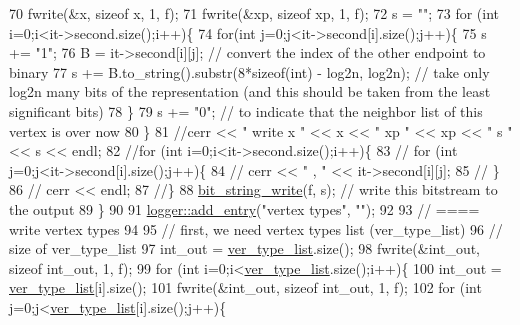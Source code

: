 \begin{DoxyCode}
70     fwrite(&x, \textcolor{keyword}{sizeof} x, 1, f);
71     fwrite(&xp, \textcolor{keyword}{sizeof} xp, 1, f);
72     s = \textcolor{stringliteral}{""};
73     \textcolor{keywordflow}{for} (\textcolor{keywordtype}{int} i=0;i<it->second.size();i++)\{
74       \textcolor{keywordflow}{for}(\textcolor{keywordtype}{int} j=0;j<it->second[i].size();j++)\{
75         s += \textcolor{stringliteral}{"1"};
76         B = it->second[i][j]; \textcolor{comment}{// convert the index of the other endpoint to binary}
77         s += B.to\_string().substr(8*\textcolor{keyword}{sizeof}(\textcolor{keywordtype}{int}) - log2n, log2n); \textcolor{comment}{// take only log2n many bits of the
       representation (and this should be taken from the least significant bits)}
78       \}
79       s += \textcolor{stringliteral}{"0"}; \textcolor{comment}{// to indicate that the neighbor list of this vertex is over now}
80     \}
81     \textcolor{comment}{//cerr << " write  x " << x << " xp " << xp << " s " << s << endl;}
82     \textcolor{comment}{//for (int i=0;i<it->second.size();i++)\{}
83     \textcolor{comment}{//  for (int j=0;j<it->second[i].size();j++)\{}
84     \textcolor{comment}{//    cerr << " , " << it->second[i][j];}
85     \textcolor{comment}{//  \}}
86     \textcolor{comment}{//  cerr << endl;}
87     \textcolor{comment}{//\}}
88     \hyperlink{compression__helper_8cpp_accfebfd921b967c2f09e8c11569eb832}{bit\_string\_write}(f, s); \textcolor{comment}{// write this bitstream to the output}
89   \}
90 
91   \hyperlink{classlogger_a710163deb17bc81f70d53d285b8ac9ac}{logger::add\_entry}(\textcolor{stringliteral}{"vertex types"}, \textcolor{stringliteral}{""});
92 
93   \textcolor{comment}{// ==== write vertex types}
94 
95   \textcolor{comment}{// first, we need vertex types list (ver\_type\_list)}
96   \textcolor{comment}{// size of ver\_type\_list}
97   int\_out = \hyperlink{classmarked__graph__compressed_af2e3e55223d436628a02758dfae88493}{ver\_type\_list}.size();
98   fwrite(&int\_out, \textcolor{keyword}{sizeof} int\_out, 1, f);
99   \textcolor{keywordflow}{for} (\textcolor{keywordtype}{int} i=0;i<\hyperlink{classmarked__graph__compressed_af2e3e55223d436628a02758dfae88493}{ver\_type\_list}.size();i++)\{
100     int\_out = \hyperlink{classmarked__graph__compressed_af2e3e55223d436628a02758dfae88493}{ver\_type\_list}[i].size();
101     fwrite(&int\_out, \textcolor{keyword}{sizeof} int\_out, 1, f);
102     \textcolor{keywordflow}{for} (\textcolor{keywordtype}{int} j=0;j<\hyperlink{classmarked__graph__compressed_af2e3e55223d436628a02758dfae88493}{ver\_type\_list}[i].size();j++)\{

\end{DoxyCode}

